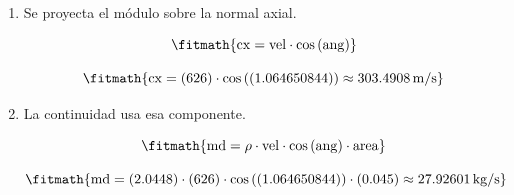 \begin{enumerate}

\item Se proyecta el módulo sobre la normal axial.

\[\fitmath{\mathrm{cx}=\mathrm{vel}\cdot \cos\left(\mathrm{ang}\right)}\]

\[\fitmath{\mathrm{cx}=(626)\cdot \cos\left((1.064650844)\right)\approx 303.4908\,\mathrm{m/s}}\]

\item La continuidad usa esa componente.

\[\fitmath{\mathrm{md}=\rho\cdot \mathrm{vel}\cdot \cos\left(\mathrm{ang}\right)\cdot \mathrm{area}}\]

\[\fitmath{\mathrm{md}=(2.0448)\cdot (626)\cdot \cos\left((1.064650844)\right)\cdot (0.045)\approx 27.92601\,\mathrm{kg/s}}\]

\end{enumerate}
